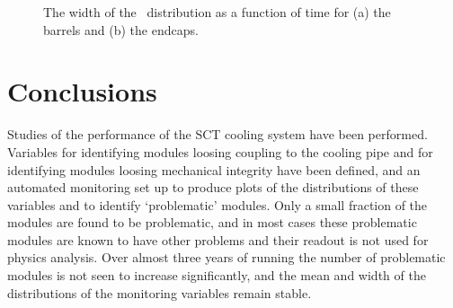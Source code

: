 \begin{figure}[h]
 	\centering
  \caption[The width of the \tdiff\ distribution as a function of time.]
  {The width of the \tdiff\ distribution as a function of time for (a)
  the barrels and (b) the endcaps.}
	\label{fig:sigma-evo-tavg}
\end{figure}

\section{Conclusions}

Studies of the performance of the SCT cooling system have been performed. 
Variables for identifying modules
loosing coupling to the cooling pipe and for identifying modules loosing
mechanical integrity have been defined, and an automated monitoring set up to
produce plots of the distributions of these variables and to
identify `problematic' modules. Only a small fraction of the modules are found
to be problematic, and in  most cases these problematic modules are known to have other
problems and their readout is not used for physics analysis. Over almost three years of
running the number of problematic modules is not seen to increase significantly,
and the mean and width of the distributions of the monitoring variables remain
stable.

